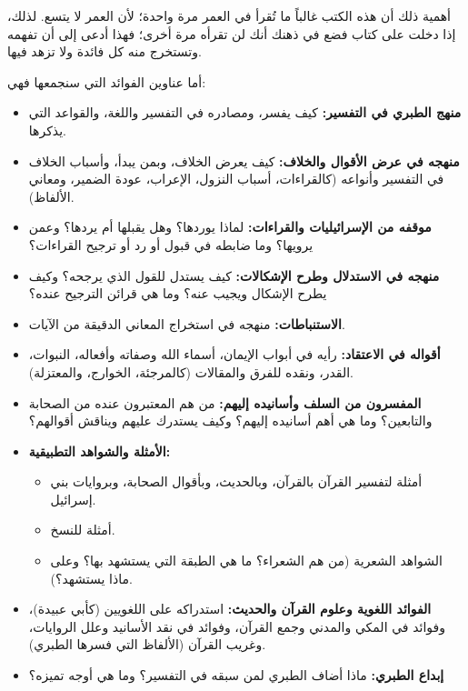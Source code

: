 أهمية ذلك أن هذه الكتب غالباً ما تُقرأ في العمر مرة واحدة؛ لأن العمر لا يتسع. لذلك، إذا دخلت على كتاب فضع في ذهنك أنك لن تقرأه مرة أخرى؛ فهذا أدعى إلى أن تفهمه وتستخرج منه كل فائدة ولا تزهد فيها.

أما عناوين الفوائد التي سنجمعها فهي:
\begin{itemize}
    \item \textbf{منهج الطبري في التفسير:} كيف يفسر، ومصادره في التفسير واللغة، والقواعد التي يذكرها.
    \item \textbf{منهجه في عرض الأقوال والخلاف:} كيف يعرض الخلاف، وبمن يبدأ، وأسباب الخلاف في التفسير وأنواعه (كالقراءات، أسباب النزول، الإعراب، عودة الضمير، ومعاني الألفاظ).
    \item \textbf{موقفه من الإسرائيليات والقراءات:} لماذا يوردها؟ وهل يقبلها أم يردها؟ وعمن يرويها؟ وما ضابطه في قبول أو رد أو ترجيح القراءات؟
    \item \textbf{منهجه في الاستدلال وطرح الإشكالات:} كيف يستدل للقول الذي يرجحه؟ وكيف يطرح الإشكال ويجيب عنه؟ وما هي قرائن الترجيح عنده؟
    \item \textbf{الاستنباطات:} منهجه في استخراج المعاني الدقيقة من الآيات.
    \item \textbf{أقواله في الاعتقاد:} رأيه في أبواب الإيمان، أسماء الله وصفاته وأفعاله، النبوات، القدر، ونقده للفرق والمقالات (كالمرجئة، الخوارج، والمعتزلة).
    \item \textbf{المفسرون من السلف وأسانيده إليهم:} من هم المعتبرون عنده من الصحابة والتابعين؟ وما هي أهم أسانيده إليهم؟ وكيف يستدرك عليهم ويناقش أقوالهم؟
    \item \textbf{الأمثلة والشواهد التطبيقية:}
    \begin{itemize}
        \item أمثلة لتفسير القرآن بالقرآن، وبالحديث، وبأقوال الصحابة، وبروايات بني إسرائيل.
        \item أمثلة للنسخ.
        \item الشواهد الشعرية (من هم الشعراء؟ ما هي الطبقة التي يستشهد بها؟ وعلى ماذا يستشهد؟).
    \end{itemize}
    \item \textbf{الفوائد اللغوية وعلوم القرآن والحديث:} استدراكه على اللغويين (كأبي عبيدة)، وفوائد في المكي والمدني وجمع القرآن، وفوائد في نقد الأسانيد وعلل الروايات، وغريب القرآن (الألفاظ التي فسرها الطبري).
    \item \textbf{إبداع الطبري:} ماذا أضاف الطبري لمن سبقه في التفسير؟ وما هي أوجه تميزه؟
\end{itemize}

\separator

